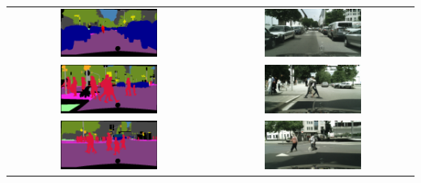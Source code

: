 \begin{longtable}{cc}
    \includegraphics[width=0.50\textwidth]{Chapters/figures/appendix/cityscapes/frankfurt_000001_047178_leftImg8bit_mask.png} & \includegraphics[width=0.50\textwidth]{Chapters/figures/appendix/cityscapes/frankfurt_000001_047178_leftImg8bit_sample.png} \\
    \includegraphics[width=0.50\textwidth]{Chapters/figures/appendix/cityscapes/frankfurt_000001_049770_leftImg8bit_mask.png} & \includegraphics[width=0.50\textwidth]{Chapters/figures/appendix/cityscapes/frankfurt_000001_049770_leftImg8bit_sample.png} \\
    \includegraphics[width=0.50\textwidth]{Chapters/figures/appendix/cityscapes/frankfurt_000001_057181_leftImg8bit_mask.png} & \includegraphics[width=0.50\textwidth]{Chapters/figures/appendix/cityscapes/frankfurt_000001_057181_leftImg8bit_sample.png} \\

\end{longtable}
